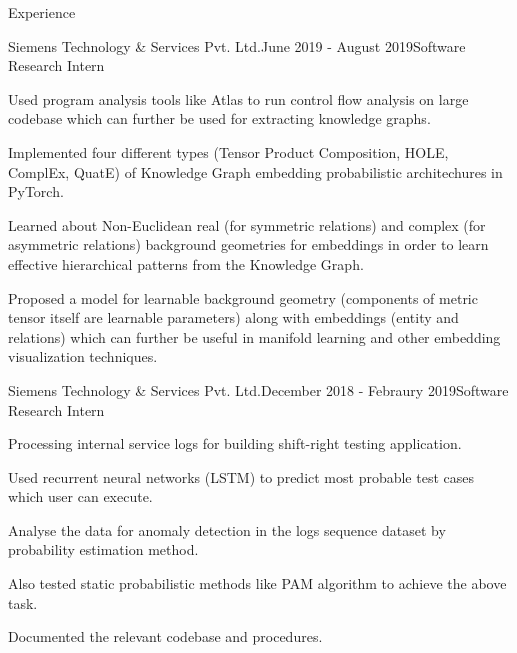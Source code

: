 \documentclass{resume} %
\begin{document}

\begin{rSection}{Experience}

\begin{rSubsection}{Siemens Technology \& Services Pvt. Ltd.}{June 2019 - August 2019}{Software Research Intern}{}
\item Used program analysis tools like Atlas to run control flow analysis on large codebase which can further be used for extracting knowledge graphs.
\item Implemented four different types (Tensor Product Composition, HOLE, ComplEx, QuatE) of Knowledge Graph embedding probabilistic architechures in PyTorch.
\item Learned about Non-Euclidean real (for symmetric relations) and complex (for asymmetric relations) background geometries for embeddings in order to learn effective hierarchical patterns from the Knowledge Graph.
\item Proposed a model for learnable background geometry (components of metric tensor itself are learnable parameters) along with embeddings (entity and relations) which can further be useful in manifold learning and other embedding visualization techniques. 
\end{rSubsection}

\newpage

\begin{rSubsection}{Siemens Technology \& Services Pvt. Ltd.}{December 2018 - Febraury 2019}{Software Research Intern}{}
\item Processing internal service logs for building shift-right testing application.
\item Used recurrent neural networks (LSTM) to predict most probable test cases which user can execute.
\item Analyse the data for anomaly detection in the logs sequence dataset by probability estimation method.
\item Also tested static probabilistic methods like PAM algorithm to achieve the above task. 
\item Documented the relevant codebase and procedures.
\end{rSubsection}


\end{rSection}
\end{document}
